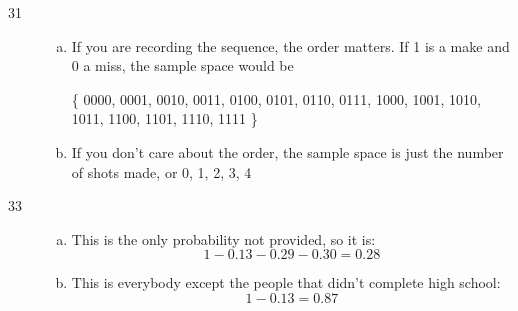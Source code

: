 \documentclass[letterpaper]{exam}
\begin{document}
    \begin{description}

      \item[31] 
        \begin{enumerate}[(a)]
          \item If you are recording the sequence, the order matters.  If 1 is a
            make and 0 a miss, the sample space would be 
            
            \{ 0000, 0001, 0010, 0011, 0100, 0101, 0110, 0111, 1000, 1001, 1010,
               1011, 1100, 1101, 1110, 1111 \}

          \item If you don't care about the order, the sample space is just the
            number of shots made, or {0, 1, 2, 3, 4 }

        \end{enumerate}




      \item[33]
        \begin{enumerate}[(a)]
          \item This is the only probability not provided, so it is:
            \[
              1 - 0.13 - 0.29 - 0.30 = \boxed{ 0.28 }
            \]

          \item This is everybody except the people that didn't complete high
            school:
            \[
              1 - 0.13 = \boxed{ 0.87 }
            \]
        \end{enumerate}


\end{description}
\end{document}
